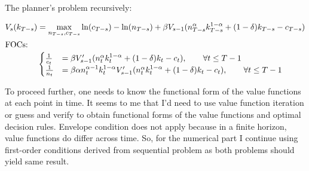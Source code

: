 \documentclass[]{article}
\begin{document}

The planner's problem recursively:

\begin{equation}
	\begin{split}
		V_{s}(k_{T - s})& = \max\limits_{n_{T - s}, c_{T - s}}\ln(c_{T - s}) - \ln(n_{T - s}) + \beta V_{s-1}(n_{T - s}^\alpha k_{T - s}^{1 - \alpha} + (1 - \delta)k_{T - s} - c_{T - s}) \nonumber \\
		\intertext{FOCs:}
		&\begin{cases}
			\frac{1}{c_t}& = \beta V_{s - 1}'(n_t^\alpha k_t^{1 - \alpha} + (1 - \delta)k_t - c_t), \qquad\forall t\leq T - 1 \\
			\frac{1}{n_t}& = \beta\alpha n_t^{\alpha - 1}k_t^{1 - \alpha}V_{s - 1}'(n_t^\alpha k_t^{1 - \alpha} + (1 - \delta)k_t - c_t), \qquad\forall t\leq T - 1 \\
		\end{cases}	
	\end{split}
\end{equation}

To proceed further, one needs to know the functional form of the value functions at each point in time. It seems to me that I'd need to use value function iteration or guess and verify to obtain functional forms of the value functions and optimal decision rules. Envelope condition does not apply because in a finite horizon, value functions do differ across time. So, for the numerical part I continue using first-order conditions derived from sequential problem as both problems should yield same result.

\subsubsection{}
\end{document}
